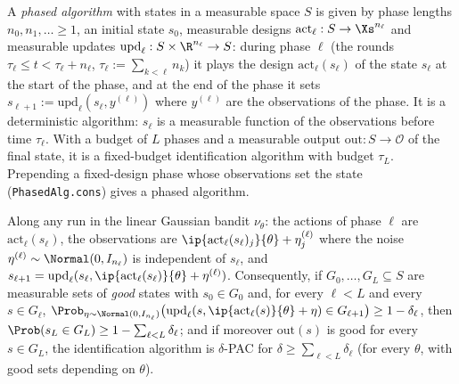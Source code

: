 \begin{lemma}\label{lem:phased}
\leanok
{}
A \emph{phased algorithm} with states in a measurable space $S$ is given by phase lengths
$n_0, n_1, \dots \ge 1$, an initial state $s_0$, measurable designs
$\mathrm{act}_\ell : S \to \Xs^{n_\ell}$ and measurable updates
$\mathrm{upd}_\ell : S \times \R^{n_\ell} \to S$: during phase $\ell$ (the rounds
$\tau_\ell \le t < \tau_\ell + n_\ell$, $\tau_\ell := \sum_{k<\ell} n_k$) it plays the design
$\mathrm{act}_\ell(s_\ell)$ of the state $s_\ell$ at the start of the phase, and at the end of
the phase it sets $s_{\ell+1} := \mathrm{upd}_\ell(s_\ell, y^{(\ell)})$ where $y^{(\ell)}$ are
the observations of the phase. It is a deterministic algorithm: $s_\ell$ is a measurable
function of the observations before time $\tau_\ell$. With a budget of $L$ phases and a
measurable output $\mathrm{out} : S \to \mathcal O$ of the final state, it is a fixed-budget
identification algorithm with budget $\tau_L$. Prepending a fixed-design phase whose
observations set the state (\texttt{PhasedAlg.cons}) gives a phased algorithm.

Along any run in the linear Gaussian bandit $\nu_\theta$: the actions of phase $\ell$ are
$\mathrm{act}_\ell(s_\ell)$, the observations are $\ip{\mathrm{act}_\ell(s_\ell)_j}{\theta} + \eta^{(\ell)}_j$
where the noise $\eta^{(\ell)} \sim \Normal(0, I_{n_\ell})$ is independent of $s_\ell$, and
$s_{\ell+1} = \mathrm{upd}_\ell(s_\ell, \ip{\mathrm{act}_\ell(s_\ell)}{\theta} + \eta^{(\ell)})$.
Consequently, if $G_0, \dots, G_L \subseteq S$ are measurable sets of \emph{good} states with
$s_0 \in G_0$ and, for every $\ell < L$ and every $s \in G_\ell$,
$\Prob_{\eta \sim \Normal(0,I_{n_\ell})}\big(\mathrm{upd}_\ell(s, \ip{\mathrm{act}_\ell(s)}{\theta} + \eta) \in G_{\ell+1}\big) \ge 1 - \delta_\ell$,
then $\Prob(s_L \in G_L) \ge 1 - \sum_{\ell<L}\delta_\ell$; and if moreover $\mathrm{out}(s)$ is
good for every $s \in G_L$, the identification algorithm is $\delta$-PAC for
$\delta \ge \sum_{\ell<L}\delta_\ell$ (for every $\theta$, with good sets depending on $\theta$).
\end{lemma}

